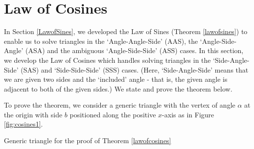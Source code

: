 \section{Law of Cosines}

\label{LawofCosines}

In Section \ref{LawofSines}, we developed the Law of Sines (Theorem \ref{lawofsines}) to enable us to solve triangles in the `Angle-Angle-Side' (AAS), the `Angle-Side-Angle' (ASA) and the ambiguous `Angle-Side-Side' (ASS) cases.  In this section, we develop the Law of Cosines which handles solving triangles in the  `Side-Angle-Side' (SAS) and  `Side-Side-Side' (SSS) cases. (Here, `Side-Angle-Side' means that we are given two sides and the `included' angle - that is, the given angle is adjacent to both of the given sides.)  We state and prove the theorem below.

\smallskip

\setboxwidth{70pt}
\noindent\begin{minipage}{\specialboxlength}

\end{minipage}
\restoreboxwidth

\smallskip

To prove the theorem, we consider a generic triangle with the vertex of angle $\alpha$ at the origin with side $b$ positioned along the positive $x$-axis as in Figure \ref{fig:cosines1}.  

\medskip

\begin{minipage}{\textwidth}
\begin{center}
\end{center}
\captionsetup{type=figure}
\caption{Generic triangle for the proof of Theorem \ref{lawofcosines}}
\label{fig:cosines1}
\end{minipage}


